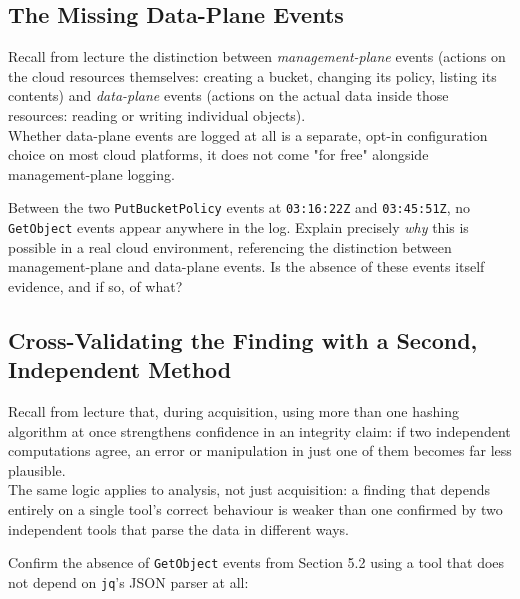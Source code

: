 \begin{answerbox}
\vspace{3cm}
\end{answerbox}

\subsection{The Missing Data-Plane Events}

Recall from lecture the distinction between \emph{management-plane} events (actions on the cloud resources themselves: creating a bucket, changing its policy, listing its contents) and \emph{data-plane} events (actions on the actual data inside those resources: reading or writing individual objects).\\ Whether data-plane events are logged at all is a separate, opt-in configuration choice on most cloud platforms, it does not come "for free" alongside
management-plane logging.

\begin{questionbox}
Between the two \texttt{PutBucketPolicy} events at \texttt{03:16:22Z} and \texttt{03:45:51Z}, no \texttt{GetObject} events appear anywhere in the log. Explain precisely \emph{why} this is possible in a real cloud environment, referencing the distinction between management-plane and data-plane events. Is the absence of these events itself evidence, and if so, of what?
\end{questionbox}

\begin{answerbox}
\vspace{3cm}
\end{answerbox}

\subsection{Cross-Validating the Finding with a Second, Independent Method}

Recall from lecture that, during acquisition, using more than one hashing algorithm at once strengthens confidence in an integrity claim: if two independent computations agree, an error or manipulation in just one of them becomes far less plausible.\\
The same logic applies to analysis, not just acquisition: a finding that depends entirely on a single tool's correct behaviour is weaker than one confirmed by two independent tools that parse the data in different ways.
\medskip

\noindent
Confirm the absence of \texttt{GetObject} events from Section 5.2 using a tool that does not depend on \texttt{jq}'s JSON parser at all:

